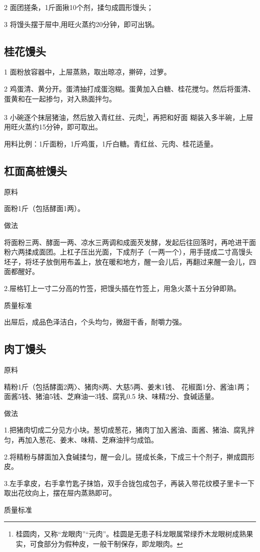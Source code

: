\documentclass{ctexbook}
\begin{document}
2 面团搓条，1斤面揪10个剂，揉匀成圆形馒头；

3 将馒头摆于屉中,用旺火蒸约20分钟，即可出锅。
\subsection{桂花馒头}
1 面粉放容器中，上屉蒸熟，取出晾凉，擀碎，过箩。

2 鸡蛋清、黄分开。蛋清抽打成蛋泡糊。蛋黄加入白糖、桂花搅匀。然后将蛋清、蛋黄和在一起掺匀，对入熟面拌匀。

3 小碗逐个抹层猪油，然后放入青红丝、元肉\footnote{桂圆肉，又称“龙眼肉”“元肉”。桂圆是无患子科龙眼属常绿乔木龙眼树成熟果实，可食部分为假种皮，一般干制保存，即龙眼肉。}，再把和好面
糊装入多半碗，上屉用旺火蒸约15分钟，即可取出。

用料比例：1斤面粉，1斤鸡蛋，1斤白糖。青红丝、元肉、桂花适量。
\subsection{杠面高桩馒头}
原料

面粉1斤（包括酵面1两）。

做法

将面粉三两、酵面一两、凉水三两调和成面芡发酵，发起后往回落时，再呛进干面粉六两揉成面团。上杠子压出光面，下成剂子（一两一个），用手搓成二寸高馒头坯子，将坯子放倒用布盖上，放在暖和地方，醒一会儿后，再翻过来醒一会儿，四面都醒好。

2.屉格钉上一寸二分高的竹签，把馒头插在竹签上，用急火蒸十五分钟即熟。

质量标准

出屉后，成品色泽洁白，个头均匀，微甜干香，耐嚼力强。
\subsection{肉丁馒头}
原料

精粉1斤（包括酵面2两〉、猪肉8两、大慈5两、姜末1钱、 花椒面1分、酱油1两；面酱5钱、猪油5钱、芝麻油一3钱、腐乳0.5 块、味精2分、食碱适量。

做法

1.把猪肉切成二分见方小块。葱切成葱花，猪肉丁加入酱油、面酱、猪油、腐乳拌匀，再加入葱花、姜末、味精、芝麻油拌匀成馅。

2.将精粉与酵面加入食碱揉匀，醒一会儿。搓成长条，下成三十个剂子，擀成圆形皮。

3.左手拿皮，右手拿竹匙子抹馅，双手合拢包成包子，再装入带花纹模子里卡一下取出花纹向上，摆在屉内蒸熟即可。

质量标准
\end{document}
